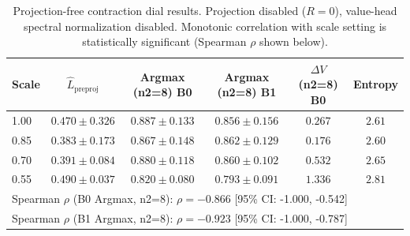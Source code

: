 \begin{table}[t]
\centering
\caption{Projection-free contraction dial results. Projection disabled ($R{=}0$), value-head spectral normalization disabled. Monotonic correlation with scale setting is statistically significant (Spearman $\rho$ shown below).}
\label{tab:exp4_projection_free_dial_v2}
\begin{tabular}{lccccc}
\toprule
Scale & $\hat{L}_{\text{preproj}}$ & Argmax (n2=8) B0 & Argmax (n2=8) B1 & $\Delta V$ (n2=8) B0 & Entropy \\
\midrule
1.00 & $0.470 \pm 0.326$ & $0.887 \pm 0.133$ & $0.856 \pm 0.156$ & $0.267$ & $2.61$ \\
0.85 & $0.383 \pm 0.173$ & $0.867 \pm 0.148$ & $0.862 \pm 0.129$ & $0.176$ & $2.60$ \\
0.70 & $0.391 \pm 0.084$ & $0.880 \pm 0.118$ & $0.860 \pm 0.102$ & $0.532$ & $2.65$ \\
0.55 & $0.490 \pm 0.037$ & $0.820 \pm 0.080$ & $0.793 \pm 0.091$ & $1.336$ & $2.81$ \\
\midrule
\multicolumn{6}{l}{\small Spearman $\rho$ (B0 Argmax, n2=8): $\rho=-0.866$ [95\% CI: -1.000, -0.542]} \\
\multicolumn{6}{l}{\small Spearman $\rho$ (B1 Argmax, n2=8): $\rho=-0.923$ [95\% CI: -1.000, -0.787]} \\
\bottomrule
\end{tabular}
\end{table}
